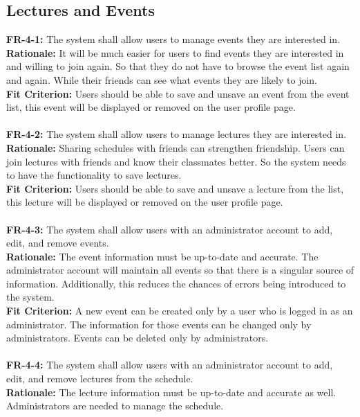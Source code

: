 \documentclass[12pt]{article}
\begin{document}
\subsection{Lectures and Events}
    \textbf{FR-4-1:} The system shall allow users to manage events they are interested in.\\
    \textbf{Rationale:} It will be much easier for users to find events they are interested in and willing to join again. So that they do not have to browse the event list again and again. While their friends can see what events they are likely to join.\\
    \textbf{Fit Criterion:} Users should be able to save and unsave an event from the event list, this event will be displayed or removed on the user profile page.\\\\
    \textbf{FR-4-2:} The system shall allow users to manage lectures they are interested in.\\
    \textbf{Rationale:} Sharing schedules with friends can strengthen friendship. Users can join lectures with friends and know their classmates better. So the system needs to have the functionality to save lectures.\\
    \textbf{Fit Criterion:} Users should be able to save and unsave a lecture from the list, this lecture will be displayed or removed on the user profile page.\\\\
    \textbf{FR-4-3:} The system shall allow users with an administrator account to add, edit, and remove events.\\
    \textbf{Rationale:} The event information must be up-to-date and accurate. The administrator account will maintain all events so that there is a singular source of information. Additionally, this reduces the chances of errors being introduced to the system.\\
    \textbf{Fit Criterion:} A new event can be created only by a user who is logged in as an administrator. The information for those events can be changed only by administrators. Events can be deleted only by administrators.\\\\
    \textbf{FR-4-4:} The system shall allow users with an administrator account to add, edit, and remove lectures from the schedule.\\
    \textbf{Rationale:} The lecture information must be up-to-date and accurate as well. Administrators are needed to manage the schedule.\\
\end{document}
